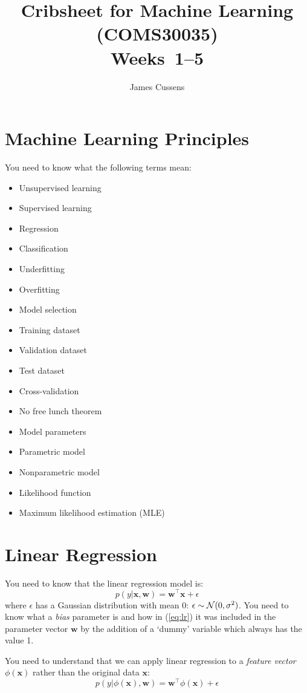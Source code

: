 \documentclass{article}
\title{Cribsheet for Machine Learning (COMS30035)\\ Weeks~1--5}
\author{James Cussens}
\newcommand{\yntk}{You need to know}
\begin{document}
\maketitle

\section{Machine Learning Principles}
\label{sec:ml}

\yntk{} what the following terms mean:

\begin{itemize}
\item Unsupervised learning
\item Supervised learning
\item Regression
\item Classification
\item Underfitting
\item Overfitting
\item Model selection
\item Training dataset
\item Validation dataset
\item Test dataset
\item Cross-validation
\item No free lunch theorem
\item Model parameters
\item Parametric model
\item Nonparametric model
\item Likelihood function
\item Maximum likelihood estimation (MLE)
\end{itemize}

\section{Linear Regression}

\yntk{} that the linear regression model is:
\begin{equation}
  \label{eq:lr}
  p(y|\mathbf{x},\mathbf{w}) = \mathbf{w}^{\top}\mathbf{x} + \epsilon 
\end{equation}
where $\epsilon$ has a Gaussian distribution with mean 0:
$\epsilon \sim {\cal N}(0,\sigma^{2})$. You need to know what a
\emph{bias} parameter is and how in (\ref{eq:lr}) it was included in
the parameter vector $\mathbf{w}$ by the addition of a `dummy'
variable which always has the value 1.

You need to understand that we can apply linear regression to a
\emph{feature vector} $\phi(\mathbf{x})$ rather than the original data
$\mathbf{x}$:
\begin{equation}
  \label{eq:lrfeats}
  p(y|\phi(\mathbf{x}),\mathbf{w}) = \mathbf{w}^{\top}\phi(\mathbf{x}) + \epsilon\end{equation}
\end{document}

